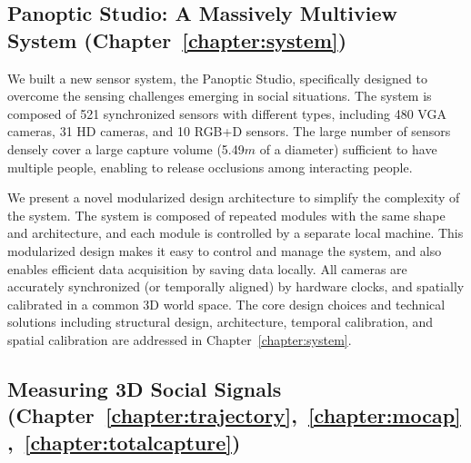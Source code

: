 \subsection{Panoptic Studio: A Massively Multiview System (Chapter~\ref{chapter:system})}
We built a new sensor system, the Panoptic Studio, specifically designed to overcome the sensing challenges emerging in social situations. The system is composed of 521 synchronized sensors with different types, including 480 VGA cameras, 31 HD cameras, and 10 RGB+D sensors. The large number of sensors densely cover a large capture volume (5.49$m$ of a diameter) sufficient to have multiple people, enabling to release occlusions among interacting people. 

We present a novel modularized design architecture to simplify the complexity of the system. The system is composed of repeated modules with the same shape and architecture, and each module is controlled by a separate local machine. This modularized design makes it easy to control and manage the system, and also enables efficient data acquisition by saving data locally. All cameras are accurately synchronized (or temporally aligned) by hardware clocks, and spatially calibrated in a common 3D world space. The core design choices and technical solutions including structural design, architecture, temporal calibration, and spatial calibration are addressed in Chapter~\ref{chapter:system}.



\subsection{Measuring 3D Social Signals (Chapter~\ref{chapter:trajectory},~\ref{chapter:mocap},~\ref{chapter:totalcapture})}

